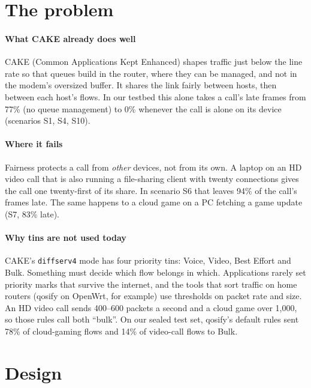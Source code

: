 \documentclass[11pt,a4paper]{article}
\begin{document}
\clearpage{}
\tableofcontents

\section{The problem}

\paragraph{What CAKE already does well} CAKE (Common Applications Kept Enhanced) shapes traffic just below the line rate so that queues build in the router, where they can be managed, and not in the modem's oversized buffer. It shares the link fairly between hosts, then between each host's flows. In our testbed this alone takes a call's late frames from 77\% (no queue management) to 0\% whenever the call is alone on its device (scenarios S1, S4, S10).

\paragraph{Where it fails} Fairness protects a call from \emph{other} devices, not from its own. A laptop on an HD video call that is also running a file-sharing client with twenty connections gives the call one twenty-first of its share. In scenario S6 that leaves 94\% of the call's frames late. The same happens to a cloud game on a PC fetching a game update (S7, 83\% late).

\paragraph{Why tins are not used today} CAKE's \texttt{diffserv4} mode has four priority tins: Voice, Video, Best Effort and Bulk. Something must decide which flow belongs in which. Applications rarely set priority marks that survive the internet, and the tools that sort traffic on home routers (qosify on OpenWrt, for example) use thresholds on packet rate and size. An HD video call sends 400--600 packets a second and a cloud game over 1,000, so those rules call both ``bulk''. On our sealed test set, qosify's default rules sent 78\% of cloud-gaming flows and 14\% of video-call flows to Bulk.

\section{Design}
\end{document}
